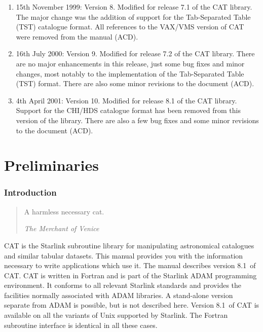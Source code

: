 \documentclass[11pt,twoside]{starlink}
\providecommand{\CATversion}{8.1~}
\begin{document}
\begin{enumerate}
  \item 15th November 1999: Version 8. Modified for release 7.1 of the
   CAT library.  The major change was the addition of support for the
   Tab-Separated Table (TST) catalogue format.  All references to
   the VAX/VMS version of CAT were removed from the manual (ACD).

  \item 16th July 2000: Version 9.  Modified for release 7.2 of the
   CAT library.  There are no major enhancements in this release, just
   some bug fixes and minor changes, most notably to the implementation
   of the Tab-Separated Table (TST) format.  There are also some minor
   revisions to the document (ACD).

  \item 4th April 2001: Version 10.  Modified for release 8.1 of the
   CAT library.  Support for the CHI/HDS catalogue format has been removed
   from this version of the library.  There are also a few bug fixes and
   some minor revisions to the document (ACD).

\end{enumerate}


\part{Preliminaries}


\section{\label{INTRO}Introduction}

\begin{quote}
\begin{center}
A harmless necessary cat.
\end{center}
\textit{The Merchant of Venice} \latex{\raggedleft}
\end{quote}


CAT is the Starlink subroutine library for manipulating astronomical
catalogues and similar tabular datasets. This manual provides you with
the information necessary to write applications which use it. The manual
describes version \CATversion of CAT. CAT is written in Fortran
and is part of the Starlink ADAM programming environment. It conforms
to all relevant Starlink standards and provides the facilities normally
associated with ADAM libraries. A stand-alone version separate from ADAM
is possible, but is not described here. Version \CATversion of CAT is
available on all the variants of Unix supported by Starlink.  The Fortran
subroutine interface is identical in all these cases.
\end{document}
